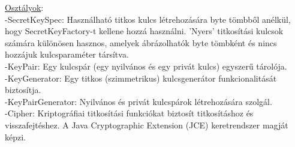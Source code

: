 \noindent \underline{Osztályok}:
\vspace{5pt}\\-SecretKeySpec: Használható titkos kulcs létrehozására byte tömbből anélkül, hogy SecretKeyFactory-t kellene hozzá használni. ’Nyers’ titkosítási kulcsok számára különösen hasznos, amelyek ábrázolhatók byte tömbként és nincs hozzájuk kulcsparaméter társítva.
\vspace{5pt}\\-KeyPair: Egy kulcspár (egy nyilvános és egy privát kulcs) egyszerű tárolója.
\vspace{5pt}\\-KeyGenerator: Egy titkos (szimmetrikus) kulcsgenerátor funkcionalitását biztosítja.
\vspace{5pt}\\-KeyPairGenerator: Nyilvános és privát kulcspárok létrehozására szolgál.
\vspace{5pt}\\-Cipher: Kriptográfiai titkosítási funkciókat biztosít titkosításhoz és visszafejtéshez. A Java Cryptographic Extension (JCE) keretrendszer magját képzi. \newline


